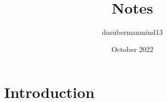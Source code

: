 \documentclass{article}
\title{Notes}
\author{dasubermanmind13 }
\date{October 2022}
\begin{document}
\maketitle

\section{Introduction}
\end{document}
